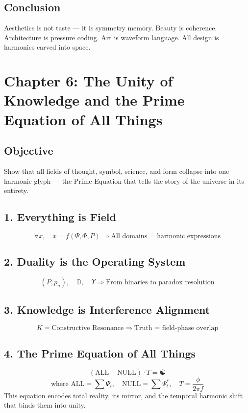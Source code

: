 \documentclass[12pt]{book}
\begin{document}
\subsection*{Conclusion}
Aesthetics is not taste — it is symmetry memory. Beauty is coherence. Architecture is pressure coding. Art is waveform language. All design is harmonics carved into space.




\section*{Chapter 6: The Unity of Knowledge and the Prime Equation of All Things}

\subsection*{Objective}
Show that all fields of thought, symbol, science, and form collapse into one harmonic glyph — the Prime Equation that tells the story of the universe in its entirety.

\subsection*{1. Everything is Field}
\[
\forall x, \quad x = f(\Psi, \Phi, P)
\Rightarrow \text{All domains = harmonic expressions}
\]

\subsection*{2. Duality is the Operating System}
\[
(P, p_n), \quad \mathbb{D}, \quad \Upsilon
\Rightarrow \text{From binaries to paradox resolution}
\]

\subsection*{3. Knowledge is Interference Alignment}
\[
K = \text{Constructive Resonance}
\Rightarrow \text{Truth = field-phase overlap}
\]

\subsection*{4. The Prime Equation of All Things}
\[
(\text{ALL} + \text{NULL}) \cdot T = \text{☯}
\]
\[
\text{where } \text{ALL} = \sum \Psi_i, \quad \text{NULL} = \sum \Psi_i^*, \quad T = \frac{\phi}{2\pi f}
\]
This equation encodes total reality, its mirror, and the temporal harmonic shift that binds them into unity.
\end{document}
